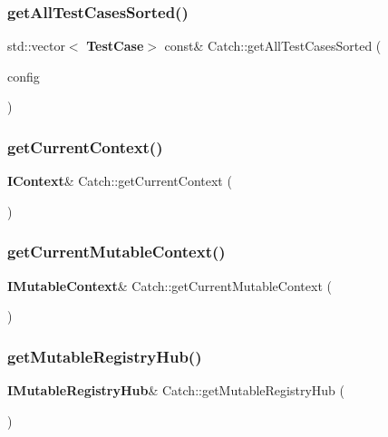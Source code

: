 \subsubsection{get\+All\+Test\+Cases\+Sorted()}
{\footnotesize\ttfamily std\+::vector$<$\textbf{ Test\+Case}$>$ const\& Catch\+::get\+All\+Test\+Cases\+Sorted (\begin{DoxyParamCaption}\item[{I\+Config const \&}]{config }\end{DoxyParamCaption})}

\mbox{\label{namespace_catch_ad517cca9b21deb79101e90e5508dd161}} 
\subsubsection{get\+Current\+Context()}
{\footnotesize\ttfamily \textbf{ I\+Context}\& Catch\+::get\+Current\+Context (\begin{DoxyParamCaption}{ }\end{DoxyParamCaption})}

\mbox{\label{namespace_catch_af7bb0c32ab2453d2f53e92a96d15360e}} 
\subsubsection{get\+Current\+Mutable\+Context()}
{\footnotesize\ttfamily \textbf{ I\+Mutable\+Context}\& Catch\+::get\+Current\+Mutable\+Context (\begin{DoxyParamCaption}{ }\end{DoxyParamCaption})}

\mbox{\label{namespace_catch_ac9ddcc6d66079add9cb2a3140b8ae51e}} 
\subsubsection{get\+Mutable\+Registry\+Hub()}
{\footnotesize\ttfamily \textbf{ I\+Mutable\+Registry\+Hub}\& Catch\+::get\+Mutable\+Registry\+Hub (\begin{DoxyParamCaption}{ }\end{DoxyParamCaption})}

